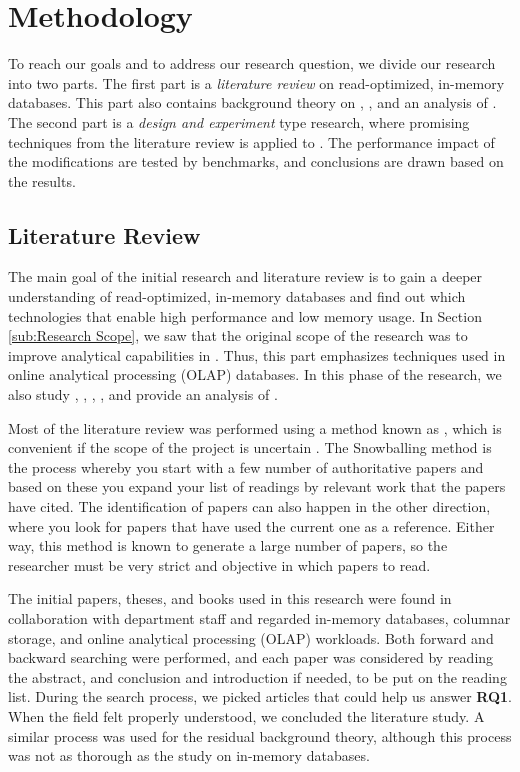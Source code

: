 \section{Methodology}
\label{sec:Methodology}
To reach our goals and to address our research question, we divide our research into two parts. The first part is a \textit{literature review} on read-optimized, in-memory databases. This part also contains background theory on \mde, \bi, and an analysis of \gap. The second part is a \textit{design and experiment} type research, where promising techniques from the literature review is applied to \gap. The performance impact of the modifications are tested by benchmarks, and conclusions are drawn based on the results.

\subsection{Literature Review}
\label{sub:Literature Review}
The main goal of the initial research and literature review is to gain a deeper understanding of read-optimized, in-memory databases and find out which technologies that enable high performance and low memory usage. In Section \ref{sub:Research Scope}, we saw that the original scope of the research was to improve analytical capabilities in \gap. Thus, this part emphasizes techniques used in online analytical processing (OLAP) databases. In this phase of the research, we also study \mde, \bi, \bd, \delphi, and provide an analysis of \gap.

Most of the literature review was performed using a method known as , which is convenient if the scope of the project is uncertain \cite{Ang2014-nm}. The Snowballing method is the process whereby you start with a few number of authoritative papers and based on these you expand your list of readings by relevant work that the papers have cited. The identification of papers can also happen in the other direction, where you look for papers that have used the current one as a reference. Either way, this method is known to generate a large number of papers, so the researcher must be very strict and objective in which papers to read.

The initial papers, theses, and books used in this research were found in collaboration with department staff and regarded in-memory databases, columnar storage, and online analytical processing (OLAP) workloads. Both forward and backward searching were performed, and each paper was considered by reading the abstract, and conclusion and introduction if needed, to be put on the reading list. During the search process, we picked articles that could help us answer \textbf{RQ1}. When the field felt properly understood, we concluded the literature study. A similar process was used for the residual background theory, although this process was not as thorough as the study on in-memory databases.

